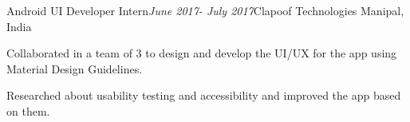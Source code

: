 \begin{rSubsection}{Android UI Developer Intern}{\em June 2017- July 2017}{Clapoof Technologies}{ Manipal, India}
    \item Collaborated in a team of 3 to design and develop the UI/UX for the app using Material Design Guidelines.
    \item Researched about usability testing and accessibility and improved the app based on them.
\end{rSubsection}